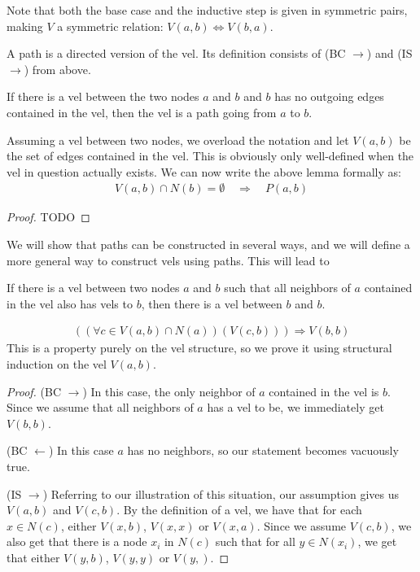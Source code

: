 Note that both the base case and the inductive step is given in symmetric pairs, making $V$ a symmetric relation: $V(a,b) \Leftrightarrow V(b,a)$.
\begin{definition}
  A path is a directed version of the vel.  Its definition consists of (BC $\rightarrow$) and (IS $\rightarrow$) from above.
\end{definition}
\begin{lemma}
  If there is a vel between the two nodes $a$ and $b$ and $b$ has no outgoing edges contained in the vel, then the vel is a path going from $a$ to $b$.
\end{lemma}
Assuming a vel between two nodes, we overload the notation and let $V(a,b)$ be the set of edges contained in the vel.  This is obviously only well-defined when the vel in question actually exists.  We can now write the above lemma formally as:
\begin{align*}
  V(a,b) \cap N(b) = \emptyset \quad \Rightarrow \quad P(a,b)
\end{align*}
\begin{proof}
  TODO
\end{proof}
We will show that paths can be constructed in several ways, and we will define a more general way to construct vels using paths.  This will lead to
\begin{lemma}
  If there is a vel between two nodes $a$ and $b$ such that all neighbors of $a$ contained in the vel also has vels to $b$, then there is a vel between $b$ and $b$.
\end{lemma}
\begin{align*}
  ((\forall c \in V(a,b) \cap N(a))(V(c,b))) \Rightarrow V(b,b)
\end{align*}
This is a property purely on the vel structure, so we prove it using structural induction on the vel $V(a,b)$.
\begin{proof}
  (BC $\rightarrow$) In this case, the only neighbor of $a$ contained in the vel is $b$.  Since we assume that all neighbors of $a$ has a vel to be, we immediately get $V(b,b)$.

  (BC $\leftarrow$) In this case $a$ has no neighbors, so our statement becomes vacuously true.

  (IS $\rightarrow$) Referring to our illustration of this situation, our assumption gives us $V(a,b)$ and $V(c,b)$.  By the definition of a vel, we have that for each $x \in N(c)$, either $V(x,b)$, $V(x,x)$ or $V(x,a)$. Since we assume $V(c,b)$, we also get that there is a node $x_i$ in $N(c)$ such that for all $y \in N(x_i)$, we get that either $V(y,b)$, $V(y,y)$ or $V(y, )$.
\end{proof}
\pagebreak
